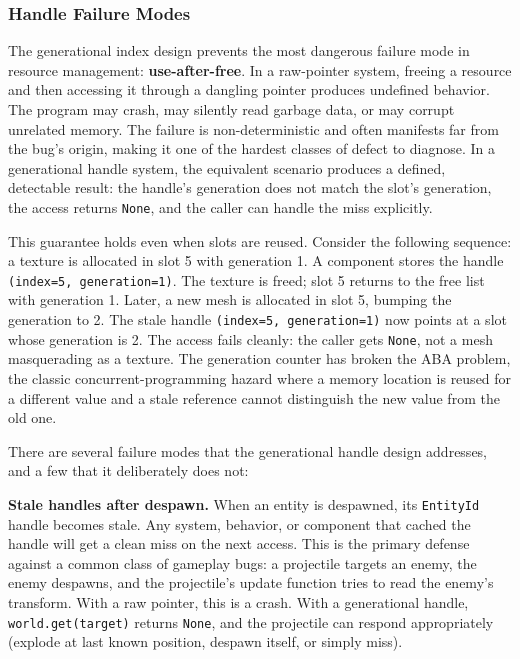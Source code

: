 \documentclass[
  11pt,
  letterpaper,
  DIV=11,
  numbers=noendperiod,
  twoside,
  open=right]{scrreprt}
\begin{document}


\subsubsection{Handle Failure Modes}\label{sec-handle-failure}

The generational index design prevents the most dangerous failure mode
in resource management: \textbf{use-after-free}. In a raw-pointer
system, freeing a resource and then accessing it through a dangling
pointer produces undefined behavior. The program may crash, may silently
read garbage data, or may corrupt unrelated memory. The failure is
non-deterministic and often manifests far from the bug's origin, making
it one of the hardest classes of defect to diagnose. In a generational
handle system, the equivalent scenario produces a defined, detectable
result: the handle's generation does not match the slot's generation,
the access returns \texttt{None}, and the caller can handle the miss
explicitly.

This guarantee holds even when slots are reused. Consider the following
sequence: a texture is allocated in slot 5 with generation 1. A
component stores the handle \texttt{(index=5,\ generation=1)}. The
texture is freed; slot 5 returns to the free list with generation 1.
Later, a new mesh is allocated in slot 5, bumping the generation to 2.
The stale handle \texttt{(index=5,\ generation=1)} now points at a slot
whose generation is 2. The access fails cleanly: the caller gets
\texttt{None}, not a mesh masquerading as a texture. The generation
counter has broken the ABA problem, the classic concurrent-programming
hazard where a memory location is reused for a different value and a
stale reference cannot distinguish the new value from the old one.

There are several failure modes that the generational handle design
addresses, and a few that it deliberately does not:

\textbf{Stale handles after despawn.} When an entity is despawned, its
\texttt{EntityId} handle becomes stale. Any system, behavior, or
component that cached the handle will get a clean miss on the next
access. This is the primary defense against a common class of gameplay
bugs: a projectile targets an enemy, the enemy despawns, and the
projectile's update function tries to read the enemy's transform. With a
raw pointer, this is a crash. With a generational handle,
\texttt{world.get(target)} returns \texttt{None}, and the projectile can
respond appropriately (explode at last known position, despawn itself,
or simply miss).
\end{document}
